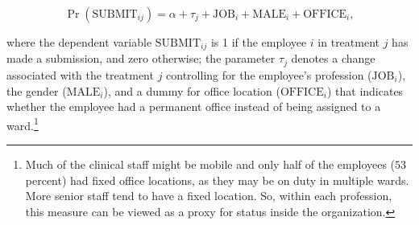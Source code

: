 \documentclass[12pt, titlepage]{article}
\begin{document}
\begin{equation} 
  \label{eq: submit}
  \Pr(\text{SUBMIT}_{ij}) 
  = \alpha + \tau_{j} + \text{JOB}_{i} + \text{MALE}_{i} + \text{OFFICE}_{i}, 
\end{equation}

where the dependent variable \(\text{SUBMIT}_{ij}\) is 1 if the employee
\(i\) in treatment \(j\) has made a submission, and zero otherwise; the
parameter \(\tau_{j}\) denotes a change associated with the treatment
\(j\) controlling for the employee's profession (\(\text{JOB}_i\)), the
gender (\(\text{MALE}_i\)), and a dummy for office location
(\(\text{OFFICE}_i\)) that indicates whether the employee had a
permanent office instead of being assigned to a ward.\footnote{Much of
  the clinical staff might be mobile and only half of the employees
  (\(53\) percent) had fixed office locations, as they may be on duty in
  multiple wards. More senior staff tend to have a fixed location. So,
  within each profession, this measure can be viewed as a proxy for
  status inside the organization.}
\end{document}

